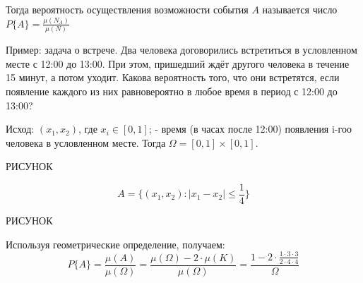 \documentclass[a4paper, 12pt]{report}
\begin{document}
		Тогда вероятность осуществления возможности события $A$ называется число $P\{A\} = \frac{\mu(N_A)}{\mu(N)}$
		
		Пример: задача о встрече. Два человека договорились встретиться в условленном месте с 12:00 до 13:00. При этом, пришедший ждёт другого человека в течение 15 минут, а потом уходит. Какова вероятность того, что они встретятся, если появление каждого из них равновероятно в любое время в период с 12:00 до 13:00?
		
		Исход: $(x_1,x_2)$, где $x_i\in[0, 1]$; - время (в часах после 12:00) появления i-гоо человека в условленном месте. Тогда $\Omega=[0,1]\times[0,1]$.
		
		РИСУНОК
		
		\begin{equation}
			A=\{(x_1, x_2): |x_1-x_2|\le \frac{1}{4}\}
		\end{equation}
	
		РИСУНОК
		
		Используя геометрические определение, получаем:
		\begin{equation}
			P\{A\}
			=\frac{\mu(A)}{\mu(\Omega)}
			=\frac{\mu(\Omega)-2\cdot\mu(K)}{\mu(\Omega)}
			=\frac{1-2\cdot\frac{1\cdot3\cdot3}{2\cdot4\cdot4}}{\Omega}
		\end{equation}
		
\end{document}
